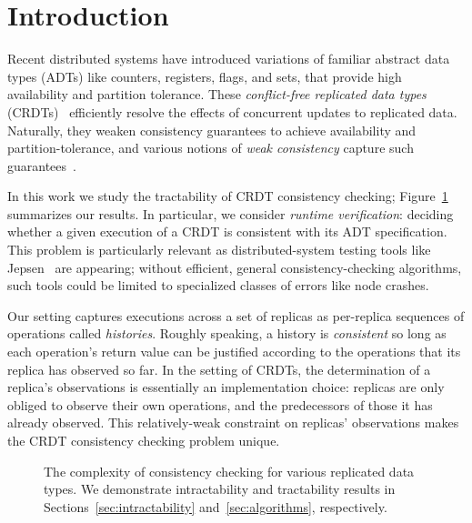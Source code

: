 
\section{Introduction}
\label{sec:crdt:intro}

Recent distributed systems have introduced variations of familiar abstract data types (ADTs) like counters, registers, flags, and sets, that provide high availability and partition tolerance. These \emph{conflict-free replicated data types} (CRDTs)~\cite{DBLP:conf/sss/ShapiroPBZ11} efficiently resolve the effects of concurrent updates to replicated data. Naturally, they weaken consistency guarantees to achieve availability and partition-tolerance, and various notions of \emph{weak consistency} capture such guarantees~\cite{DBLP:conf/pdis/TerryDPSTW94, DBLP:conf/sosp/TerryTPDSH95, DBLP:conf/popl/MansonPA05, DBLP:journals/ftpl/Burckhardt14, DBLP:conf/popl/BurckhardtGYZ14}.

In this work we study the tractability of CRDT consistency checking; Figure~\ref{fig:results} summarizes our results. In particular, we consider \emph{runtime verification}: deciding whether a given execution of a CRDT is consistent with its ADT specification. This problem is particularly relevant as distributed-system testing tools like Jepsen~\cite{MISC:Jepsen} are appearing; without efficient, general consistency-checking algorithms, such tools could be limited to specialized classes of errors like node crashes.

Our setting captures executions across a set of replicas as per-replica sequences of operations called \emph{histories}. Roughly speaking, a history is \emph{consistent} so long as each operation’s return value can be justified according to the operations that its replica has observed so far. In the setting of CRDTs, the determination of a replica’s observations is essentially an implementation choice: replicas are only obliged to observe their own operations, and the predecessors of those it has already observed. This relatively-weak constraint on replicas’ observations makes the CRDT consistency checking problem unique.

\begin{figure}[t]
  \centering
  
  \caption{The complexity of consistency checking for various replicated data types. We demonstrate intractability and tractability results in Sections~\ref{sec:intractability} and~\ref{sec:algorithms}, respectively.}
  \label{fig:results}
\end{figure}

